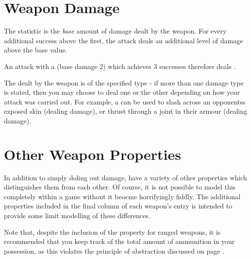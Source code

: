 \section{Weapon Damage}

The  statistic is the {\it base} amount of damage dealt by the weapon. For every additional success above the first, the attack deals an additional level of damage above the base value.

An attack with a  (base damage 2) which achieves 3 successes therefore deals .   

The  dealt by the weapon is of the specified type - if more than one damage type is stated, then you may choose to deal one or the other depending on how your attack was carried out. For example, a  can be used to slash across an opponentss exposed skin (dealing  damage), or thrust through a joint in their armour (dealing  damage). 

\section{Other Weapon Properties}

In addition to simply doling out damage,  have a variety of other properties which distinguishes them from each other. Of course, it is not possible to model this completely within a game without it beocme horrifyingly fiddly. The additional properties included in the final column of each weapon's entry is intended to provide some limit modelling of these differences. 

\begin{itemize}
	
\end{itemize}

Note that, despite the inclusion of the  property for ranged weapons, it is  recommended that you keep track of the total amount of ammunition in your possession, as this violates the principle of abstraction discussed on page \pageref{S:ItemAbstraction}.
